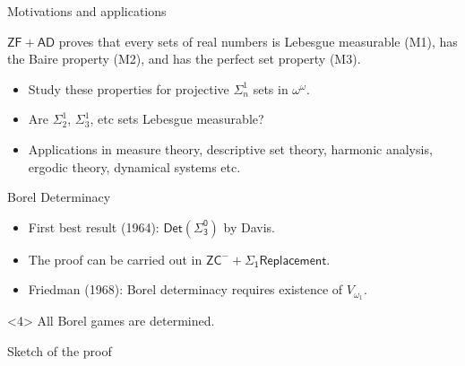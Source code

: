 \documentclass{beamer} %
\begin{document}

\begin{frame}{Motivations and applications}

    \begin{theorem}
        $\mathsf{ZF + AD}$ proves  that every sets of real numbers is Lebesgue measurable (M1), has 
        the Baire property (M2), and has the perfect set property (M3).
    \end{theorem}

    \begin{itemize}
        \item<2-> Study these properties for projective $\Sigma^1_n$ sets in $\omega^{\omega}$. 
        \item<3-> Are $\Sigma^1_2$, $\Sigma^1_3$, etc sets Lebesgue measurable? 
        \item<4> Applications in measure theory, descriptive set theory, harmonic analysis, ergodic theory, 
        dynamical systems etc.
    \end{itemize}

\end{frame}


\begin{frame}{Borel Determinacy}
    \begin{itemize}
        \item<1-> First best result (1964): $\mathsf{Det(\Sigma^0_3)}$ by Davis.
        \item<2-> The proof can be carried out in $\mathsf{ZC^- + \Sigma_1 Replacement}$.
        \item<3-> Friedman (1968): Borel determinacy requires existence of $V_{\omega_1}$. 
    \end{itemize}

    \begin{theorem}<4>
        All Borel games are determined.
    \end{theorem}

\end{frame}


\begin{frame}{Sketch of the proof}
    
\end{frame}
\end{document}
